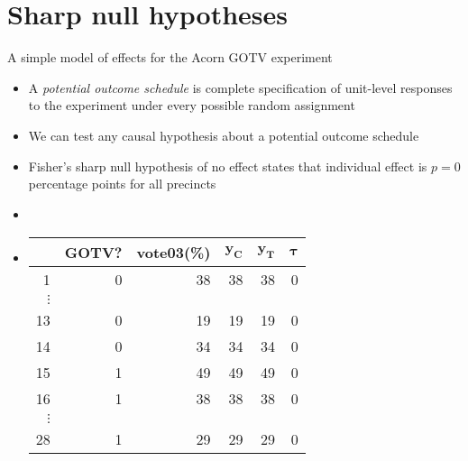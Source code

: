 \documentclass[table, xcolor = {dvipsnames}, 9pt]{beamer}
\theoremstyle{plain}
\begin{document}
\section{Sharp null hypotheses}
\begin{frame}{A simple model of effects for the Acorn GOTV experiment}
\begin{itemize}
\item A \textit{potential outcome schedule} is complete specification of unit-level responses to the experiment under every possible random assignment \pause 
\item We can test any causal hypothesis about a potential outcome schedule \pause 
\item Fisher's sharp null hypothesis of no effect states that individual effect is $p = 0$ percentage points for all precincts \pause 
\item[]
\item[]
\begin{center}
  \begin{tabular}{r|rr|rrr}
  \hline
 & GOTV? & vote03(\%)& $\bm{y_C}$ & $\bm{y_T}$ & $\bm{\tau}$\\
  \hline
1 & 0 & 38 & 38 & 38 & 0 \\
$\vdots$& & & & & \\
13 & 0 & 19 & 19 & 19 & 0 \\
14 & 0 & 34 & 34 & 34 & 0 \\
15 & 1 & 49 & 49 & 49 & 0 \\
16 & 1 & 38 & 38 & 38 & 0 \\
$\vdots$& & & & & \\
28 & 1 & 29 & 29 & 29 & 0 \\
   \hline
\end{tabular}
\end{center}
\end{itemize}
\end{frame}
\end{document}
